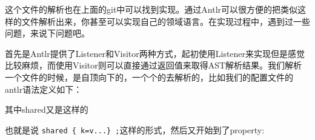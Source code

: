 \documentclass[12pt]{article}
\begin{document}
\begin{Shaded}
\begin{Highlighting}[]
\OperatorTok{\{}
\OperatorTok{+}
 \OperatorTok{/}      \OperatorTok{()}
 \OperatorTok{/}\OperatorTok{/:}  \OperatorTok{(}\OperatorTok{:} \OperatorTok{)}
\OperatorTok{\}}
\end{Highlighting}
\end{Shaded}

这个文件的解析也在上面的git中可以找到实现。通过Antlr可以很方便的把类似这样的文件解析出来，你甚至可以实现自己的领域语言。在实现过程中，遇到过一些问题，来说下问题吧。

首先是Antlr提供了Listener和Visitor两种方式，起初使用Listener来实现但是感觉比较麻烦，而使用Visitor则可以直接通过返回值来取得AST解析结果。我们解析一个文件的时候，是自顶向下的，一个个的去解析的，比如我们的配置文件的antlr语法定义如下：

\begin{Shaded}
\begin{Highlighting}[]
    \OperatorTok{:} \OperatorTok{*}
    \OperatorTok{;}
\end{Highlighting}
\end{Shaded}

其中shared又是这样的

\begin{Shaded}
\begin{Highlighting}[]
    \OperatorTok{:} \OperatorTok{(} \OperatorTok{)*}  
    \OperatorTok{;}
\end{Highlighting}
\end{Shaded}

也就是说 \texttt{shared\ \{\ k=v...\}\ ;}这样的形式，然后又开始到了property:

\begin{Shaded}
\begin{Highlighting}[]
    \OperatorTok{:}            \OperatorTok{\#}
    \OperatorTok{|}    
        \OperatorTok{(} \OperatorTok{)*}
                                   \OperatorTok{\#}
    \OperatorTok{;}
\end{Highlighting}
\end{Shaded}
\end{document}
